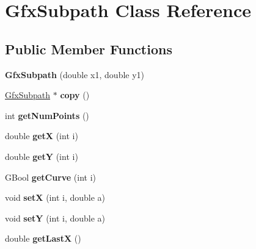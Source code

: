 \hypertarget{class_gfx_subpath}{}\section{Gfx\+Subpath Class Reference}
\label{class_gfx_subpath}
\subsection*{Public Member Functions}
\begin{DoxyCompactItemize}
\item 
\mbox{\label{class_gfx_subpath_a7e018961fda357a1f2275a14686004d1}} 
{\bfseries Gfx\+Subpath} (double x1, double y1)
\item 
\mbox{\label{class_gfx_subpath_a9349db70fe1450a69e216dfbd0bf67cf}} 
\hyperlink{class_gfx_subpath}{Gfx\+Subpath} $\ast$ {\bfseries copy} ()
\item 
\mbox{\label{class_gfx_subpath_a593641bcc525bca1120f0ba9d3413c89}} 
int {\bfseries get\+Num\+Points} ()
\item 
\mbox{\label{class_gfx_subpath_aae19245413712fa869945fe7d7ad086f}} 
double {\bfseries getX} (int i)
\item 
\mbox{\label{class_gfx_subpath_aaee6c704d7c2c2ad7521cf2394352bf2}} 
double {\bfseries getY} (int i)
\item 
\mbox{\label{class_gfx_subpath_afaa819d7061631f7b531d943bdc7d835}} 
G\+Bool {\bfseries get\+Curve} (int i)
\item 
\mbox{\label{class_gfx_subpath_a75cae362979c57a62c49f1ed0f0ab1ec}} 
void {\bfseries setX} (int i, double a)
\item 
\mbox{\label{class_gfx_subpath_aa612d7955701e88840e712e35e01f924}} 
void {\bfseries setY} (int i, double a)
\item 
\mbox{\label{class_gfx_subpath_a3c1af93c51b522f4589fff46c10aa885}} 
double {\bfseries get\+LastX} ()
\item 
\mbox{\label{class_gfx_subpath_a7e81f31afcf224eef7cc9938ce3f3ae3}} 

\end{DoxyCompactItemize}
